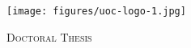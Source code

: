 \documentclass[
11pt, %
english, %
singlespacing, %
toctotoc, %
headsepline, %
]{MastersDoctoralThesis} %
\author{Savvas \textsc{Paragkamian}} %
\begin{document}
\frontmatter %

\pagestyle{plain} %
\hypersetup{linkcolor=teal}

\begin{titlepage}
\begin{center}
\begin{minipage}{4cm}
\begin{flushleft}
    \raggedleft
\texttt{[image: figures/uoc-logo-1.jpg]} %
\end{flushleft}
\end{minipage}
\begin{minipage}{6cm}
\begin{flushright}
\LARGE \univname
\end{flushright}
\end{minipage}

\vspace{1cm}
\textsc{\Large Doctoral Thesis}\\[0.5cm] %

\HRule \\[0.4cm] %
{\huge \bfseries \ttitle\par}\vspace{0.4cm} %
\HRule \\[1.0cm] %
 

\end{center}
\end{titlepage}
\end{document}
